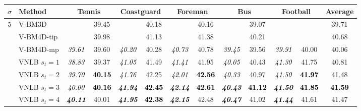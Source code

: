 \documentclass[10pt, journal, twocolumn, final, a4paper]{IEEEtran}
\newcommand{\best}[1]{#1}
\newcommand{\bsic}[1]{\textcolor{black}{\textit{#1}}}
\newcommand{\Bsic}[1]{\textcolor{black}{\textbf{\textit{#1}}}}
\newcommand{\Best}[1]{\textbf{\textcolor{black}{#1}}}
\begin{document}
%

\begin{table}[htp!]
	\begin{center}
		{\small
		\renewcommand{\tabcolsep}{1.6mm}
		\renewcommand{\arraystretch}{1.3}
		\begin{tabular}{ c | l |c c | c c | c c | c c | c c | c}
			\hline
			\rule{0pt}{10pt}$\sigma$ & Method            & \multicolumn{2}{c}{Tennis}  & \multicolumn{2}{c}{Coastguard}&\multicolumn{2}{c}{Foreman}& \multicolumn{2}{c}{Bus}     &\multicolumn{2}{c|}{Football}& Average\\\hline
			\multirow{1}{*}{$ 5$}
			                      & V-BM3D               & \bsic{     } &       39.45  & \bsic{     } &       40.18  & \bsic{     } &       40.16  & \bsic{     } &       39.07  & \bsic{     } &              &       39.71  \\
			                      & V-BM4D-tip           & \bsic{     } & \best{39.98} & \bsic{     } & \best{41.13} & \bsic{     } & \best{41.38} & \bsic{     } & \best{40.21} & \bsic{     } & \best{     } & \best{40.68} \\
			                      & V-BM4D-mp            & \bsic{39.61} &       39.60  & \bsic{40.20} &       40.28  & \bsic{40.73} &       40.78  & \bsic{39.45} &       39.56  & \bsic{39.91} &       40.00  &       40.06  \\
			                      & VNLB   $s_t = 1$     & \bsic{38.83} &       39.37  & \bsic{41.05} &       41.49  & \bsic{41.41} &       41.95  & \bsic{40.05} &       40.43  & \bsic{41.30} &       41.75  &       40.81  \\
			                      & VNLB   $s_t = 2$     & \bsic{39.70} & \Best{40.15} & \bsic{41.76} &       42.25  & \bsic{42.01} & \Best{42.56} & \bsic{40.33} &       40.97  & \bsic{41.50} & \Best{41.97} &       41.48  \\
			                      & VNLB   $s_t = 3$     & \bsic{40.00} & \Best{40.16} & \Bsic{41.94} & \Best{42.45} & \Bsic{42.14} & \Best{42.61} & \Bsic{40.43} & \Best{41.12} & \Bsic{41.50} & \Best{41.85} & \Best{41.59} \\
			                      & VNLB   $s_t = 4$     & \Bsic{40.11} &      {40.01} & \Bsic{41.95} & \Best{42.38} & \Bsic{42.15} &       42.48  & \Bsic{40.47} &       41.02  & \Bsic{41.44} &      {41.61} &       41.47  \\\hline

\end{tabular}}
\end{center}
\end{table}
\end{document}
